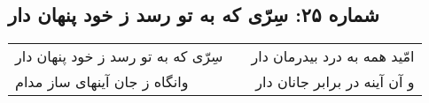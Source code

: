 \begin{center}
\section*{شماره ۲۵: سِرّی که به تو رسد ز خود پنهان دار}
\label{sec:025}
\begin{longtable}{l p{0.5cm} r}
سِرّی که به تو رسد ز خود پنهان دار
&&
امّید همه به درد بیدرمان دار
\\
وانگاه ز جان آینهای ساز مدام
&&
و آن آینه در برابر جانان دار
\\
\end{longtable}
\end{center}
